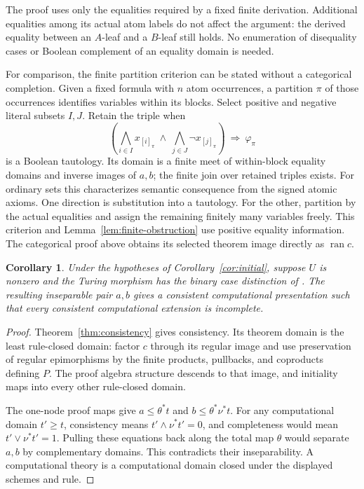 \documentclass[11pt]{article}
\newtheorem{corollary}[theorem]{Corollary}
\theoremstyle{definition}\newtheorem{definition}[theorem]{Definition}
\theoremstyle{remark}\newtheorem{remark}[theorem]{Remark}
\newcommand{\ran}{\operatorname{ran}}
\begin{document}
The proof uses only the equalities required by a fixed finite
derivation. Additional equalities among its actual atom labels do
not affect the argument: the derived equality between an \(A\)-leaf
and a \(B\)-leaf still holds. No enumeration of disequality cases
or Boolean complement of an equality domain is needed.

For comparison, the finite partition criterion can be stated without
a categorical completion. Given a fixed formula with \(n\) atom
occurrences, a partition \(\pi\) of those occurrences identifies
variables within its blocks. Select positive and negative literal
subsets \(I,J\). Retain the triple when
\[
 \left(\bigwedge_{i\in I}x_{[i]_\pi}\ \wedge\
       \bigwedge_{j\in J}\neg x_{[j]_\pi}\right)
       \ \Longrightarrow\ \varphi_\pi
\]
is a Boolean tautology. Its domain is a finite meet of within-block
equality domains and inverse images of \(a,b\); the finite join
over retained triples exists. For ordinary sets this characterizes
semantic consequence from the signed atomic axioms. One direction
is substitution into a tautology. For the other, partition by the
actual equalities and assign the remaining finitely many variables
freely. This criterion and Lemma~\ref{lem:finite-obstruction} use
positive equality information. The categorical proof above obtains
its selected theorem image directly as \(\ran c\).

\begin{corollary}\label{cor:essential}
Under the hypotheses of Corollary~\ref{cor:initial}, suppose \(U\)
is nonzero and the Turing morphism has the binary case distinction
of \cite[Proposition~1.1]{FiniteProofs}. The resulting inseparable
pair \(a,b\) gives a consistent computational presentation such that
every consistent computational extension is incomplete.
\end{corollary}
\begin{proof}
Theorem~\ref{thm:consistency} gives consistency. Its theorem domain
is the least rule-closed domain: factor \(c\) through its regular
image and use preservation of regular epimorphisms by the finite
products, pullbacks, and coproducts defining \(P\). The proof
algebra structure descends to that image, and initiality maps into
every other rule-closed domain.

The one-node proof maps give
\(a\le\theta^*t\) and \(b\le\theta^*\nu^*t\).
For any computational domain \(t'\ge t\), consistency means
\(t'\wedge\nu^*t'=0\), and completeness would mean
\(t'\vee\nu^*t'=1\). Pulling these equations back along the total
map \(\theta\) would separate \(a,b\) by complementary domains.
This contradicts their inseparability. A computational theory is
a computational domain closed under the displayed schemes and rule.
\end{proof}
\end{document}
